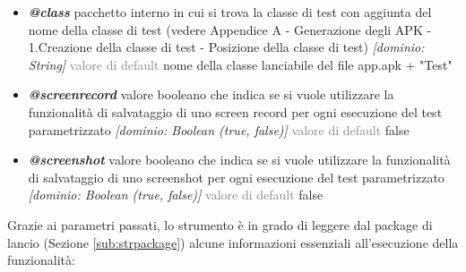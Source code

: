 \begin{itemize} [nosep]
\item \textbf{\emph{@class}} pacchetto interno in cui si trova la classe di test con aggiunta del nome della classe di test (vedere Appendice A - Generazione degli APK - 1.Creazione della classe di test - Posizione della classe di test) \emph{[dominio: String]} \newline
\textcolor{gray}{valore di default} nome della classe lanciabile del file app.apk + "Test" 
\item \textbf{\emph{@screenrecord}} valore booleano che indica se si vuole utilizzare la funzionalità di salvataggio di uno screen record per ogni esecuzione del test parametrizzato  \emph{[dominio: Boolean (true, false)]} \newline
\textcolor{gray}{valore di default} false
\item \textbf{\emph{@screenshot}} valore booleano che indica se si vuole utilizzare la funzionalità di salvataggio di uno screenshot per ogni esecuzione del test parametrizzato  \emph{[dominio: Boolean (true, false)]} \newline
\textcolor{gray}{valore di default} false
\end{itemize}
\bigskip
\noindent Grazie ai parametri passati, lo strumento è in grado di leggere dal package di lancio (Sezione \ref{sub:strpackage}) alcune informazioni essenziali all'esecuzione della funzionalità:
